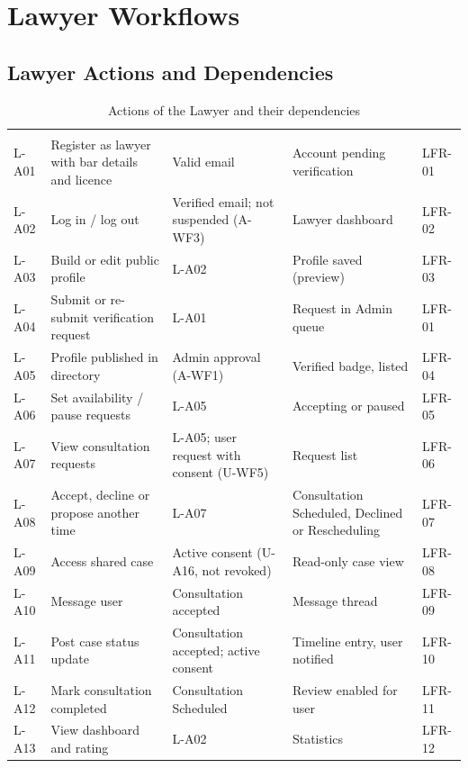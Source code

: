 \chapter{Lawyer Workflows}\label{ch:3}

\section{Lawyer Actions and Dependencies}

\begin{longtable}{|L{1.87cm}|L{4.05cm}|L{2.81cm}|L{3.12cm}|L{1.70cm}|}
\caption{Actions of the Lawyer and their dependencies}\label{tab:3.1}\\
\hline\headrow {} &  &  &  &  \\ \hline
\endfirsthead
\hline\headrow {} &  &  &  &  \\ \hline
\endhead
\hline\endlastfoot
L-A01 & Register as lawyer with bar details and licence & Valid email & Account pending verification & LFR-01 \\ \hline
L-A02 & Log in / log out & Verified email; not suspended (A-WF3) & Lawyer dashboard & LFR-02 \\ \hline
L-A03 & Build or edit public profile & L-A02 & Profile saved (preview) & LFR-03 \\ \hline
L-A04 & Submit or re-submit verification request & L-A01 & Request in Admin queue & LFR-01 \\ \hline
L-A05 & Profile published in directory & Admin approval (A-WF1) & Verified badge, listed & LFR-04 \\ \hline
L-A06 & Set availability / pause requests & L-A05 & Accepting or paused & LFR-05 \\ \hline
L-A07 & View consultation requests & L-A05; user request with consent (U-WF5) & Request list & LFR-06 \\ \hline
L-A08 & Accept, decline or propose another time & L-A07 & Consultation Scheduled, Declined or Rescheduling & LFR-07 \\ \hline
L-A09 & Access shared case & Active consent (U-A16, not revoked) & Read-only case view & LFR-08 \\ \hline
L-A10 & Message user & Consultation accepted & Message thread & LFR-09 \\ \hline
L-A11 & Post case status update & Consultation accepted; active consent & Timeline entry, user notified & LFR-10 \\ \hline
L-A12 & Mark consultation completed & Consultation Scheduled & Review enabled for user & LFR-11 \\ \hline
L-A13 & View dashboard and rating & L-A02 & Statistics & LFR-12 \\
\end{longtable}

